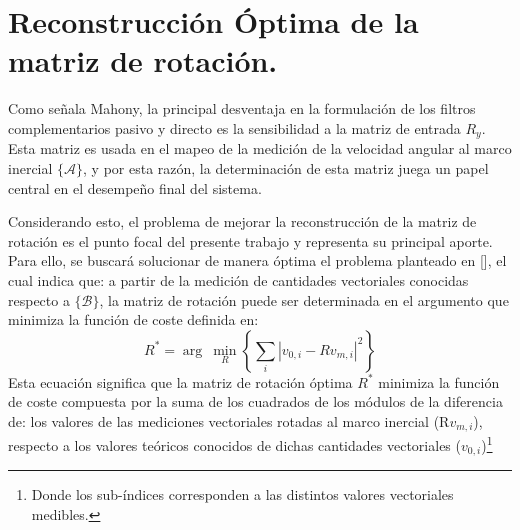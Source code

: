 \documentclass[10pt]{report}
\numberwithin{equation}{chapter}
\numberwithin{algorithm}{chapter}
\newcommand{\marco}[1]{\{\mathcal{#1}\}}
\begin{document}
\section{Reconstrucción Óptima de la matriz de rotación.}\label{Propuesta}
Como señala Mahony, la principal desventaja en la formulación de los filtros complementarios pasivo y directo es la sensibilidad a la matriz de entrada $R_y$. Esta matriz es usada en el mapeo de la medición de la velocidad angular al marco inercial $\marco{A}$, y por esta razón, la determinación de esta matriz juega un papel central en el desempeño final del sistema.\par
Considerando esto, el problema de mejorar la reconstrucción de la matriz de rotación es el punto focal del presente trabajo y representa su principal aporte. Para ello, se buscará solucionar de manera óptima el problema planteado en [\cite{Mahony2008}], el cual indica que: a partir de la medición de cantidades vectoriales conocidas respecto a $\marco{B}$, la matriz de rotación puede ser determinada en el argumento que minimiza la función de coste definida en:
\begin{equation}\label{chap2:DefincionRoptima}
R^*=\arg~\min_{R}\left\{\sum_i|v_{0,i}-Rv_{m,i}|^2\right\}
\end{equation}
Esta ecuación significa que la matriz de rotación óptima $R^*$ minimiza la función de coste compuesta por la suma de los cuadrados de los módulos de la diferencia de: los valores de las mediciones vectoriales rotadas al marco inercial (R$v_{m,i}$), respecto a los valores teóricos conocidos de dichas cantidades vectoriales ($v_{0,i}$)\footnote{Donde los sub-índices corresponden a las distintos valores vectoriales medibles.}
\end{document}
